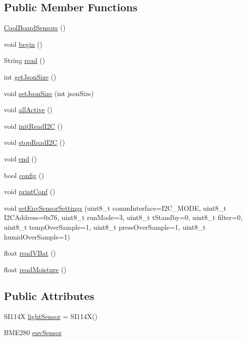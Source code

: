 \subsection*{Public Member Functions}
\begin{DoxyCompactItemize}
\item 
\hyperlink{class_cool_board_sensors_a91ff2a02f5486f90cf2413a1cf8a9ed4}{Cool\+Board\+Sensors} ()
\item 
void \hyperlink{class_cool_board_sensors_a97095823ef7c8f5290812f1405b966b3}{begin} ()
\item 
String \hyperlink{class_cool_board_sensors_a91badb2539d91fda8679f2a597874c48}{read} ()
\item 
int \hyperlink{class_cool_board_sensors_ab82c2a1633768ccd12a589320fa31a14}{get\+Json\+Size} ()
\item 
void \hyperlink{class_cool_board_sensors_ab76e6dbd6efbcc25ff460535badd8d45}{set\+Json\+Size} (int json\+Size)
\item 
void \hyperlink{class_cool_board_sensors_aa432c5aac88f89c31a10766390f23e0b}{all\+Active} ()
\item 
void \hyperlink{class_cool_board_sensors_acad6a8418c66d36868caca23c844ecb6}{init\+Read\+I2C} ()
\item 
void \hyperlink{class_cool_board_sensors_ab67b900b9e5e7c18d52d2d9107ba171b}{stop\+Read\+I2C} ()
\item 
void \hyperlink{class_cool_board_sensors_a4902b69f6e628bd6557193758fdd2bae}{end} ()
\item 
bool \hyperlink{class_cool_board_sensors_a9a218895c5423375c33c08f2c56fb23a}{config} ()
\item 
void \hyperlink{class_cool_board_sensors_af6fd79505815b204c178617ecf54c873}{print\+Conf} ()
\item 
void \hyperlink{class_cool_board_sensors_a406307ffd70272282d91479c7ed8d66f}{set\+Env\+Sensor\+Settings} (uint8\+\_\+t comm\+Interface=I2\+C\+\_\+\+M\+O\+DE, uint8\+\_\+t I2\+C\+Address=0x76, uint8\+\_\+t run\+Mode=3, uint8\+\_\+t t\+Standby=0, uint8\+\_\+t filter=0, uint8\+\_\+t temp\+Over\+Sample=1, uint8\+\_\+t press\+Over\+Sample=1, uint8\+\_\+t humid\+Over\+Sample=1)
\item 
float \hyperlink{class_cool_board_sensors_a6944b6ea7bce8e2fce1b434acfd9d5f3}{read\+V\+Bat} ()
\item 
float \hyperlink{class_cool_board_sensors_a8761bff50373c485f4465c8db47d0633}{read\+Moisture} ()
\end{DoxyCompactItemize}
\subsection*{Public Attributes}
\begin{DoxyCompactItemize}
\item 
S\+I114X \hyperlink{class_cool_board_sensors_a3e397300fb707dd193e909a757bf6102}{light\+Sensor} = S\+I114X()
\item 
B\+M\+E280 \hyperlink{class_cool_board_sensors_a868e38985e9a2412829fa2790ca13e2e}{env\+Sensor}
\end{DoxyCompactItemize}


